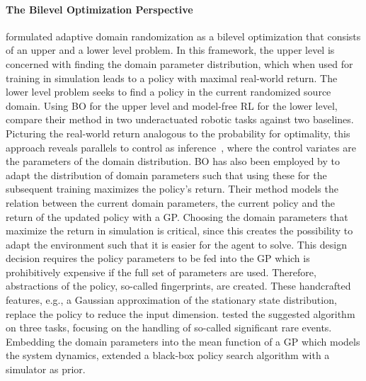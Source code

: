 \documentclass[utf8]{frontiersSCNS} %
\begin{document}

\paragraph*{The Bilevel Optimization Perspective}
%
\citet{Muratore_Peters_21_RAL} formulated adaptive domain randomization as a bilevel optimization that consists of an upper and a lower level problem.
In this framework, the upper level is concerned with finding the domain parameter distribution, which when used for training in simulation leads to a policy with maximal real-world return.
The lower level problem seeks to find a policy in the current randomized source domain.
Using \ac{BO} for the upper level and model-free \ac{RL} for the lower level, \citet{Muratore_Peters_21_RAL} compare their method in two underactuated \simtoreal robotic tasks against two baselines.
Picturing the real-world return analogous to the probability for optimality, this approach reveals parallels to control as inference~\citep{Rawlik_Vijayakumar_13,Levine_Koltun_13,Watson_Peters_21}, where the control variates are the parameters of the domain distribution.
%
\ac{BO} has also been employed by \citet{Paul_etal_2018} to adapt the distribution of domain parameters such that using these for the subsequent training maximizes the policy's return.
Their method models the relation between the current domain parameters, the current policy and the return of the updated policy with a \ac{GP}.
Choosing the domain parameters that maximize the return in simulation is critical, since this creates the possibility to adapt the environment such that it is easier for the agent to solve.
This design decision requires the policy parameters to be fed into the \ac{GP} which is prohibitively expensive if the full set of parameters are used.
Therefore, abstractions of the policy, so-called fingerprints, are created.
These handcrafted features, e.g., a Gaussian approximation of the stationary state distribution, replace the policy to reduce the input dimension.
\citet{Paul_etal_2018} tested the suggested algorithm on three \simtosim tasks, focusing on the handling of so-called significant rare events.
%
Embedding the domain parameters into the mean function of a \ac{GP} which models the system dynamics, \citet{Chatzilygeroudis_Mouret_18} extended a black-box policy search algorithm \citep{Chatzilygeroudis_Mouret_17} with a simulator as prior.
\end{document}
